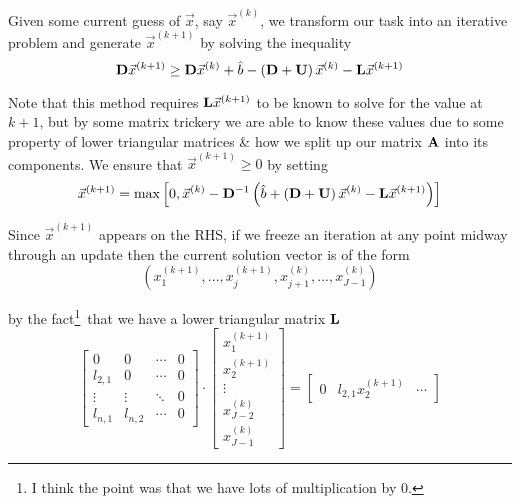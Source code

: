 \documentclass[12pt]{article}
\newlength\tindent
\renewcommand{\indent}{\hspace*{\tindent}}
\begin{document}
\indent Given some current guess of $\vec{x}$, say $\vec{x}^{(k)}$, we transform our task into an iterative problem and generate $\vec{x}^{(k + 1)}$ by solving the inequality
\begin{equation*}
	{\bf D} \vec{x}^{(k + 1)} \geq {\bf D}\vec{x}^{(k)} + \hat{b} - \left({\bf D} + {\bf U} \right)\vec{x}^{(k)} - {\bf L}\vec{x}^{(k + 1)} 
\end{equation*}

\indent Note that this method requires ${\bf L}\vec{x}^{(k + 1)}$ to be known to solve for the value at $k + 1$, but by some matrix trickery we are able to know these values due to some property of lower triangular matrices \& how we split up our matrix ${\bf A}$ into its components. We ensure that $\vec{x}^{(k + 1)} \geq 0$ by setting
\begin{equation*}
	\vec{x}^{(k + 1)} = \max \left[0, \vec{x}^{(k)} - {\bf D}^{-1}\left( \hat{b} + \left( {\bf D } + {\bf U} \right)\vec{x}^{(k)} - {\bf L}\vec{x}^{(k + 1)} \right) \right]
\end{equation*}

\indent Since $\vec{x}^{(k + 1)}$ appears on the RHS, if we freeze an iteration at any point midway through an update then the current solution vector is of the form
\begin{equation*}
	\left(x_1^{(k + 1)}, ..., x_j^{(k + 1)}, x_{j + 1}^{(k)}, ..., x_{J - 1}^{(k)} \right)
\end{equation*}

by the fact\footnote{I think the point was that we have lots of multiplication by 0.}~that we have a lower triangular matrix ${\bf L}$
\begin{equation*}
	\begin{bmatrix}
		0 & 0 & \cdots & 0 \\
		l_{2,1} & 0 & \cdots & 0 \\
		\vdots & \vdots & \ddots & 0 \\
		l_{n,1} & l_{n,2} & \cdots & 0
	\end{bmatrix} 
	\cdot
	\begin{bmatrix}
		x_1^{(k + 1)} \\
		x_2^{(k + 1)} \\
		\vdots \\
		x^{(k)}_{J - 2} \\
		x^{(k)}_{J - 1}
	\end{bmatrix} 
	= 
	\begin{bmatrix}
		0 & l_{2,1}x_2^{(k + 1)} & \cdots
	\end{bmatrix}
\end{equation*}
\end{document}
